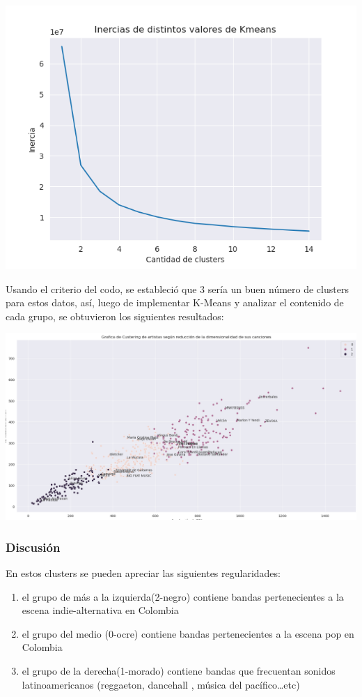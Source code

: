 \documentclass[11pt]{article}
\begin{document}
\begin{center}
\includegraphics[width=.9\linewidth]{./images/inercias1.png}
\end{center}

Usando el criterio del codo, se estableció
que 3 sería un buen número de clusters para estos datos, así, luego de
implementar K-Means y analizar el contenido de cada grupo, se obtuvieron los
siguientes resultados:

\begin{center}
\includegraphics[width=.9\linewidth]{./images/clustering1.png}
\end{center}

\subsubsection{Discusión}
\label{sec:orgbfe8ecc}
En estos clusters se pueden apreciar las siguientes regularidades:
\begin{enumerate}
\item el grupo de más a la izquierda(2-negro) contiene bandas pertenecientes a la escena indie-alternativa en Colombia
\item el grupo del medio (0-ocre) contiene bandas pertenecientes a la escena pop en Colombia
\item el grupo de la derecha(1-morado) contiene bandas que frecuentan sonidos latinoamericanos (reggaeton, dancehall , música del pacífico\ldots{}etc)
\end{enumerate}
\end{document}
